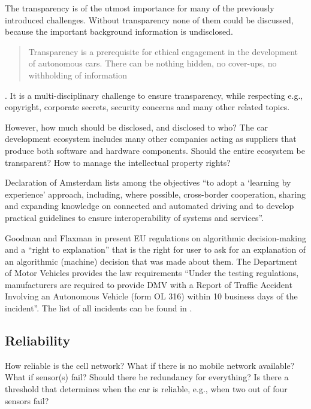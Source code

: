 The transparency is of the utmost importance for many of the previously introduced challenges. Without transparency none of them could be discussed, because the important background information is undisclosed. \blockquote{Transparency is a prerequisite for ethical engagement in the development of autonomous cars. There can be nothing hidden, no cover-ups, no withholding of information} \cite{McBride:2016:EDC:2874239.2874265}. It is a multi-disciplinary challenge to ensure transparency, while respecting e.g., copyright, corporate secrets, security concerns and many other related topics. 

However, how much should be disclosed, and disclosed to who? The car development ecosystem includes many other companies acting as suppliers that produce both software and hardware components. Should the entire ecosystem be transparent? How to manage the intellectual property rights?

Declaration of Amsterdam \cite{GovernmentNL2017} lists among the objectives \enquote{to adopt a \enquote{learning by experience} approach, including, where possible, cross-border cooperation, sharing and expanding knowledge on connected and automated driving and to develop practical guidelines to ensure interoperability of systems and services}.

Goodman and Flaxman in \cite{2016arXiv160608813G_GoodmanFlaxman} present EU regulations on algorithmic decision-making and a \enquote{right to explanation} that is the right for user to ask for an explanation of an algorithmic (machine) decision that was made about them.
The Department of Motor Vehicles provides the law requirements \cite{DepartmentofMotorVehiclesStateofCalifornia} \enquote{Under the testing regulations, manufacturers are required to provide DMV with a Report of Traffic Accident Involving an Autonomous Vehicle (form OL 316) within 10 business days of the incident}. The list of all incidents can be found in \cite{DepartmentofMotorVehiclesStateofCalifornia_OL316Reports}.


\subsection{Reliability}
\label{sec:EAofTC:Reliability}

How reliable is the cell network? What if there is no mobile network available? What if sensor(s) fail? Should there be redundancy for everything? Is there a threshold that determines when the car is reliable, e.g., when two out of four sensors fail?  

